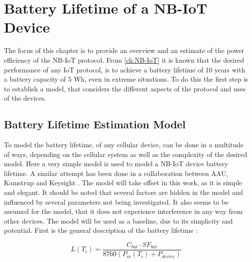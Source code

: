 \chapter{Battery Lifetime of a NB-IoT Device} \label{ch:BatTest}

The focus of this chapter is to provide an overview and an estimate of the power efficiency of the NB-IoT protocol. From \autoref{ch:NB-IoT} it is known that the desired performance of any IoT protocol, is to achieve a battery lifetime of 10 years with a battery capacity of 5 Wh, even in extreme situations. To do this the first step is to establish a model, that considers the different aspects of the protocol and uses of the devices.

\section{Battery Lifetime Estimation Model}
\label{sec:bat_model}

To model the battery lifetime, of any cellular device, can be done in a multitude of ways, depending on the cellular system as well as the complexity of the desired model. Here a very simple model is used to model a NB-IoT device battery lifetime. A similar attempt has been done in a collaboration between AAU, Kamstrup and Keysight \citep{Power_article}. The model will take offset in this work, as it is simple and elegant. It should be noted that several factors are hidden in the model and influenced by several parameters not being investigated. It also seems to be assumed for the model, that it does not experience interference in any way from other devices. The model will be used as a baseline, due to its simplicity and potential. First is the general description of the battery lifetime \citep{Power_article}:

\begin{equation}
L(T_i) = \frac{C_{bat}\cdot SF_{bat}}{8760 \left(P_m(T_i) + P_{device}\right)}
\end{equation}
\begin{where}
\end{where}

